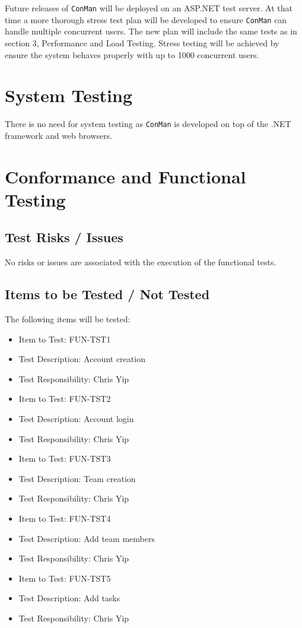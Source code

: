 \documentclass{article}
\begin{document}
Future releases of \texttt{ConMan} will be deployed on an ASP.NET test server.
At that time a more thorough stress test plan will be developed to ensure \texttt{ConMan} can handle multiple concurrent users.
The new plan will include the same tests as in section 3, Performance and Load Testing. 
Stress testing will be achieved by ensure the system behaves properly with up to 1000 concurrent users.

\newpage
\section{System Testing}
There is no need for system testing as \texttt{ConMan} is developed on top 
of the .NET framework and web browsers.

\newpage
\section{Conformance and Functional Testing}
\subsection{Test Risks / Issues}
No risks or issues are associated with the execution of the functional tests.

\subsection{Items to be Tested / Not Tested}
The following items will be tested:
\begin{itemize}
\item Item to Test: FUN-TST1 
\item Test Description: Account creation
\item Test Responsibility: Chris Yip 
\end{itemize}
\begin{itemize}
\item Item to Test: FUN-TST2 
\item Test Description: Account login 
\item Test Responsibility: Chris Yip 
\end{itemize}
\begin{itemize}
\item Item to Test: FUN-TST3 
\item Test Description: Team creation 
\item Test Responsibility: Chris Yip 
\end{itemize}
\begin{itemize}
\item Item to Test: FUN-TST4
\item Test Description: Add team members
\item Test Responsibility: Chris Yip 
\end{itemize}
\begin{itemize}
\item Item to Test: FUN-TST5
\item Test Description: Add tasks
\item Test Responsibility: Chris Yip 
\end{itemize}
\end{document}
